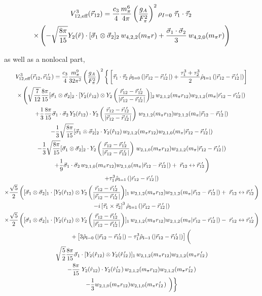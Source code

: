 \begin{multline}
V^{3}_{12,\text{eff}}(\vec{r}_{12})=\frac{c_3 }{4}\frac{m_\pi^6}{4\pi}\left(\frac{g_A}{F_\pi^2}\right)^2 \rho_{I=0}\;\vec{\tau}_1\cdot\vec{\tau}_2\:\\
 \times\left(-\sqrt{\frac{8\pi}{15}}Y_2(\hat{r})\cdot[\vec{\sigma}_1\otimes\vec{\sigma}_2]_2\: w_{4,2,2}(m_\pi r) + \frac{\vec{\sigma}_1\cdot\vec{\sigma}_2}{3}\:  w_{4,2,0}(m_\pi r) \right)
\end{multline}

as well as a nonlocal part,
\begin{multline}
V^{3}_{12,\text{eff}}(\rot,\rotp)=\frac{c_3 }{4}\frac{m_\pi^9}{32\pi^2}\left(\frac{g_A}{F_\pi^2}\right)^2 \left\{\fracphantom\left[\taudot \:\rhohat{0}{|\rot-\rotp|} +\tauplusthree \rhohat{1}{|\rot-\rotp|} \right]\right. \\
%
\times\left(\sqrt{\frac{7}{12}}\frac{8\pi}{15}\sigmatwo\cdot  [ Y_2(\hat{r}_{12})\otimes Y_2 \left(\frac{\rot-\rotp}{|\rot-\rotp|}\right) ]_2\, \w{2}{1}{2}{m_\pi r_{12}}\w{2}{1}{2}{m_\pi |\rot-\rotp|} 
\right.\\ 
%
+\frac{1}{3}\frac{8\pi}{15}\sigmadot \, Y_2(\hat{r}_{12})\cdot Y_2 \left(\frac{\rot-\rotp}{|\rot-\rotp|}\right)  \,\w{2}{1}{2}{m_\pi r_{12}}\w{2}{1}{2}{m_\pi |\rot-\rotp|} \\
%
-\frac{1}{3}\sqrt{\frac{8\pi}{15}}\sigmatwo \cdot Y_2(\hat{r}_{12}) \,\w{2}{1}{2}{m_\pi r_{12}}\w{2}{1}{0}{m_\pi |\rot-\rotp|} \\
-\frac{1}{3}\sqrt{\frac{8\pi}{15}}\sigmatwo \cdot Y_2 \left(\frac{\rot-\rotp}{|\rot-\rotp|}\right) \,\w{2}{1}{0}{m_\pi r_{12}}\w{2}{1}{2}{m_\pi |\rot-\rotp|} \\
\left.+\frac{1}{9}\sigmadot \, \w{2}{1}{0}{m_\pi r_{12}}\w{2}{1}{0}{m_\pi |\rot-\rotp|}+\; \rot \leftrightarrow \rotp \fracphantom\right) \\
%
%
+\tau_1^3 \rhohat{1}{|\rot-\rotp|} \\
\times\frac{\sqrt{5}}{2}\left(\fracphantom  \sigmaone \cdot  [ Y_2(\hat{r}_{12})\otimes Y_2 \left(\frac{\rot-\rotp}{|\rot-\rotp|}\right) ]_1  \,\w{2}{1}{2}{m_\pi r_{12}}\w{2}{1}{2}{m_\pi |\rot - \rotp|} + \; \rot \leftrightarrow \rotp \fracphantom\right)\\
%
-i\taucrossthree \rhohat{1}{|\rot-\rotp|} \\
\times\frac{\sqrt{5}}{2}\left(\fracphantom \sigmaone \cdot  [ Y_2(\hat{r}_{12})\otimes Y_2 \left(\frac{\rot-\rotp}{|\rot-\rotp|}\right) ]_1  \,\w{2}{1}{2}{m_\pi r_{12}}\w{2}{1}{2}{m_\pi |\rot-\rotp|} - \; \rot \leftrightarrow \rotp \fracphantom\right) \\
%
%
+\left[3\rhohat{0}{|\rot-\rotp|}-\tau_1^3 \rhohat{1}{|\rot-\rotp|}\right]\left( \fracphantom\right. \\
\sqrt{\frac{5}{2}}\frac{8\pi}{15}  \vec{\sigma}_1 \cdot [Y_2 (\hat{r}_{12}) \otimes Y_2(\rotphat)]_1 \,\w{2}{1}{2}{m_\pi r_{12}} \w{2}{1}{2}{m_\pi\rotpr}  \\
-\frac{8\pi}{15}\;Y_2 (\hat{r}_{12}) \cdot Y_2(\rotphat) \,\w{2}{1}{2}{m_\pi r_{12}} \w{2}{1}{2}{m_\pi\rotpr} \\
%
-\frac{1}{3} \w{2}{1}{0}{m_\pi r_{12}} \w{2}{1}{0}{m_\pi\rotpr} \left. \left.\fracphantom\right)\right\}
\end{multline}

